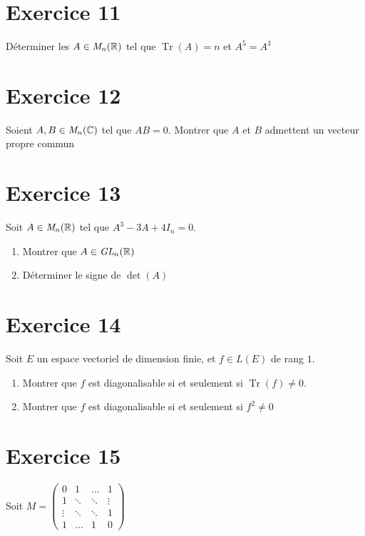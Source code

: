 \documentclass[11pt]{article}
\begin{document}
\section*{Exercice 11}

Déterminer les $A\in \emph{M}_n(\mathbb{R})$ tel que $\operatorname{Tr}(A)=n$ et $A^5=A^3$

\section*{Exercice 12}

Soient $A,B\in \emph{M}_n(\mathbb{C})$ tel que $AB=0$. Montrer que $A$ et $B$ admettent un vecteur propre commun 

\section*{Exercice 13}
Soit $A\in \emph{M}_n(\mathbb{R})$ tel que $A^3 -3A+4I_n =0$.
\begin{enumerate}
\item Montrer que $A\in \emph{GL}_n(\mathbb{R})$
\item Déterminer le signe de $\det(A)$
\end{enumerate}


\section*{Exercice 14}


Soit $E$ un espace vectoriel de dimension finie, et $f\in \textit{L}(E)$ de rang $1$.
\begin{enumerate}
\item Montrer que $f$ est diagonalisable si et seulement si $\operatorname{Tr}(f)\neq0$.
\item Montrer que $f$ est diagonalisable si et seulement si $f^2\neq0$
\end{enumerate}
  

\section*{Exercice 15}

Soit $M=\begin{pmatrix}
0 & 1 & \dots & 1\\
1 & \ddots & \ddots & \vdots\\
\vdots &  \ddots & \ddots & 1\\
1 & \dots & 1 & 0
\end{pmatrix}$
\end{document}
